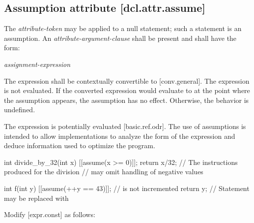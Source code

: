 \begin{adjustwidth}{0.5cm}{0.5cm}
\begin{addedblock}
\subsection*{Assumption attribute \hspace{7.33cm} [dcl.attr.assume]}

The \textit{attribute-token}  may be applied to a null statement; such a statement is an assumption. An \textit{attribute-argument-clause} shall be present and shall have the form:

\hspace{5mm}\tcode{( }\textit{assignment-expression}\tcode{ )}

The expression shall be contextually convertible to  [conv.general]. The expression is not evaluated. If the converted expression would evaluate to  at the point where the assumption appears, the assumption has no effect. Otherwise, the behavior is undefined.

\begin{note}
The expression is potentially evaluated [basic.ref.odr]. The use of assumptions is intended to allow implementations to analyze the form of the expression and deduce information used to optimize the program.
\end{note}

\begin{example}
\begin{codeblock}
int divide_by_32(int x)  {
  [[assume(x >= 0)]];
  return x/32;   // The instructions produced for the division
                 //  may omit handling of negative values
}

int f(int y) {
  [[assume(++y == 43)]];   //  is not incremented
  return y;                // Statement may be replaced with 
}
\end{codeblock}
\end{example}
\end{addedblock}
\end{adjustwidth}

Modify [expr.const] as follows:


